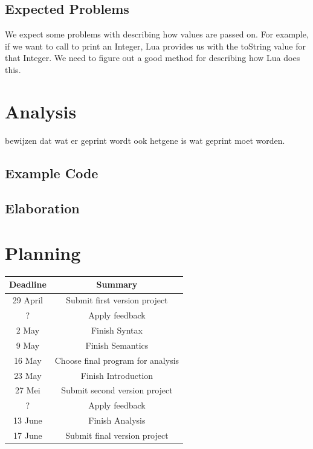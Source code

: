 \documentclass{article}
\begin{document}
\subsection{Expected Problems}
We expect some problems with describing how values are passed on. For example, if we want to call to print an Integer, Lua provides us with the toString value for that Integer. We need to figure out a good method for describing how Lua does this.

\section{Analysis}
bewijzen dat wat er geprint wordt ook hetgene is wat geprint moet worden. 
\subsection{Example Code}

\subsection{Elaboration}

\newpage
\appendix
\section{Planning}
\begin{tabular}{|c|c|}
\hline
 Deadline   &  Summary \\
 \hline
    29 April & Submit first version project \\
    ? & Apply feedback \\
   2 May & Finish Syntax\\
   9 May & Finish Semantics\\
   16 May & Choose final program for analysis\\
      23 May & Finish Introduction\\
    27 Mei & Submit second version project \\
    ? & Apply feedback \\
    13 June & Finish Analysis\\
    17 June & Submit final version project \\
    \hline
\end{tabular}
\end{document}
